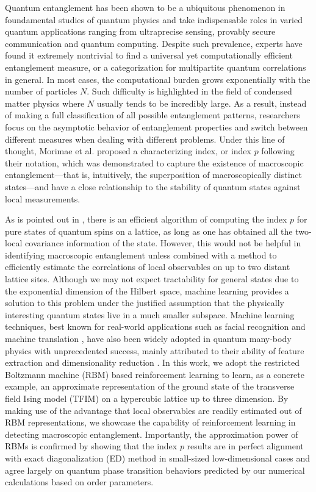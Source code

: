 \documentclass[aps,prl,reprint,superscriptaddress]{revtex4-2}
\begin{document}
Quantum entanglement has been shown to be a ubiquitous phenomenon in foundamental studies of quantum physics and take indispensable roles in varied quantum applications ranging from ultraprecise sensing, provably secure communication and quantum computing. Despite such prevalence, experts have found it extremely nontrivial to find a universal yet computationally efficient entanglement measure, or a categorization for multipartite quantum correlations in general. In most cases, the computational burden grows exponentially with the number of particles $ N $. Such difficulty is highlighted in the field of condensed matter physics where $ N $ usually tends to be incredibly large. As a result, instead of making a full classification of all possible entanglement patterns, researchers focus on the asymptotic behavior of entanglement properties and switch between different measures when dealing with different problems. Under this line of thought, Morimae et al. \cite{Morimae2005Macroscopic} proposed a characterizing index, or index $ p $ following their notation, which was demonstrated to capture the existence of macroscopic entanglement---that is, intuitively, the superposition of macroscopically distinct states---and have a close relationship to the stability of quantum states against local measurements.

As is pointed out in \cite{Morimae2005Macroscopic}, there is an efficient algorithm of computing the index $ p $ for pure states of quantum spins on a lattice, as long as one has obtained all the two-local covariance information of the state. However, this would not be helpful in identifying macroscopic entanglement unless combined with a method to efficiently estimate the correlations of local observables on up to two distant lattice sites. Although we may not expect tractability for general states due to the exponential dimension of the Hilbert space, machine learning provides a solution to this problem under the justified assumption that the physically interesting quantum states live in a much smaller subspace. Machine learning techniques, best known for real-world applications such as facial recognition and machine translation \cite{Lecun2015Deep}, have also been widely adopted in quantum many-body physics with unprecedented success, mainly attributed to their ability of feature extraction and dimensionality reduction \cite{Carleo2017Solving,Carrasquilla2017ML-phase,Deng2017ML-topo,Deng2018ML-Bell,Dunjko2018ML-AI-quantum-review}. In this work, we adopt the restricted Boltzmann machine (RBM) based reinforcement learning to learn, as a concrete example, an approximate representation of the ground state of the transverse field Ising model (TFIM) on a hypercubic lattice up to three dimension. By making use of the advantage that local observables are readily estimated out of RBM representations, we showcase the capability of reinforcement learning in detecting macroscopic entanglement. Importantly, the approximation power of RBMs is confirmed by showing that the index $ p $ results are in perfect alignment with exact diagonalization (ED) method in small-sized low-dimensional cases and agree largely on quantum phase transition behaviors predicted by our numerical calculations based on order parameters.
\end{document}
